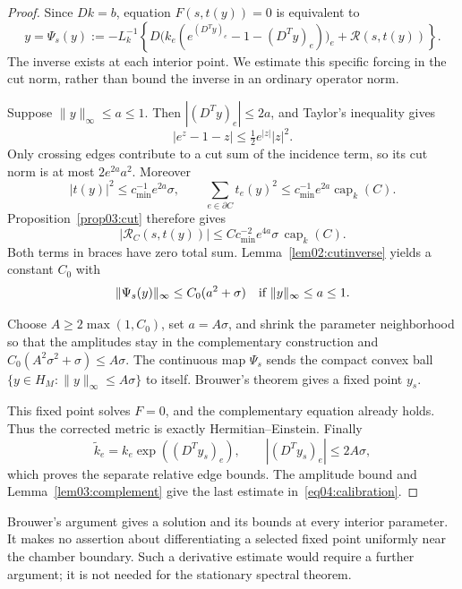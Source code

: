 \documentclass[11pt]{amsart}
\theoremstyle{definition}
\theoremstyle{remark}
\newcommand{\capk}{\operatorname{cap}}
\newcommand{\cR}{\mathcal R}
\begin{document}
\begin{proof}
Since \(Dk=b\), equation \(F(s,t(y))=0\) is equivalent to
\begin{equation}\label{eq04:fixedpoint}
 y=\Psi_s(y):=-L_k^{-1}
 \left\{D\bigl(k_e(e^{(D^Ty)_e}-1-(D^Ty)_e)\bigr)_e
                   +\cR(s,t(y))\right\}.
\end{equation}
The inverse exists at each interior point. We estimate this
specific forcing in the cut norm, rather than bound the inverse
in an ordinary operator norm.

Suppose \(\|y\|_\infty\leq a\leq1\). Then
\(|(D^Ty)_e|\leq2a\), and Taylor's inequality gives
\[
 |e^z-1-z|\leq \tfrac12 e^{|z|}|z|^2.
\]
Only crossing edges contribute to a cut sum of the incidence term,
so its cut norm is at most \(2e^{2a}a^2\).
Moreover
\[
 |t(y)|^2\leq c_{\min}^{-1}e^{2a}\sigma,\qquad
 \sum_{e\in\partial C}t_e(y)^2
 \leq c_{\min}^{-1}e^{2a}\capk_k(C).
\]
Proposition~\ref{prop03:cut} therefore gives
\[
 |\cR_C(s,t(y))|
 \leq Cc_{\min}^{-2}e^{4a}\sigma\,\capk_k(C).
\]
Both terms in braces have zero total sum.
Lemma~\ref{lem02:cutinverse} yields a constant \(C_0\) with
\begin{equation}\label{eq04:selfmap}
 \|\Psi_s(y)\|_\infty\leq C_0(a^2+\sigma)
 \quad\hbox{if }\|y\|_\infty\leq a\leq1.
\end{equation}

Choose \(A\geq2\max(1,C_0)\), set \(a=A\sigma\), and
shrink the parameter neighborhood so that the amplitudes stay in
the complementary construction and
\(C_0(A^2\sigma^2+\sigma)\leq A\sigma\).
The continuous map \(\Psi_s\) sends the compact convex ball
\(\{y\in H_M:\|y\|_\infty\leq A\sigma\}\) to itself.
Brouwer's theorem gives a fixed point \(y_s\).

This fixed point solves \(F=0\), and the complementary equation
already holds. Thus the corrected metric is exactly
Hermitian--Einstein. Finally
\[
 \widetilde k_e=k_e\exp((D^Ty_s)_e),\qquad
 |(D^Ty_s)_e|\leq2A\sigma,
\]
which proves the separate relative edge bounds.
The amplitude bound and Lemma~\ref{lem03:complement} give the
last estimate in~\eqref{eq04:calibration}.
\end{proof}

Brouwer's argument gives a solution and its bounds at every interior
parameter. It makes no assertion about differentiating a selected
fixed point uniformly near the chamber boundary. Such a derivative
estimate would require a further argument; it is not needed for
the stationary spectral theorem.
\end{document}

